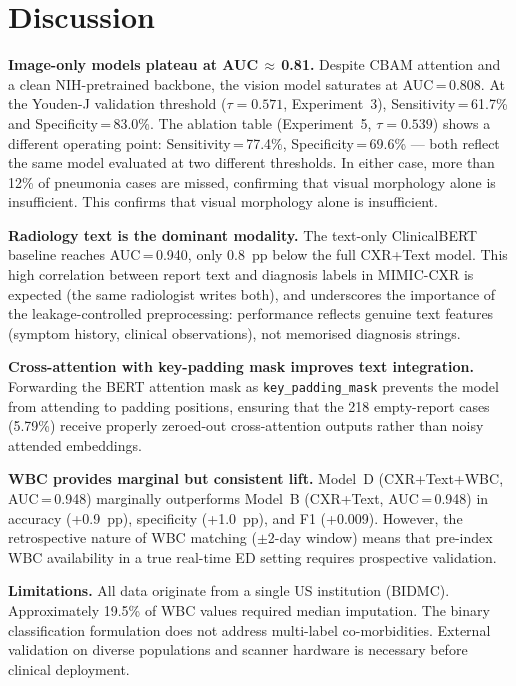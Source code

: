 \documentclass[conference]{IEEEtran}
\begin{document}
\section{\textcolor{aideep}{Discussion}}

\textbf{Image-only models plateau at AUC\,$\approx$\,0.81.} Despite CBAM attention and a clean NIH-pretrained backbone, the vision model saturates at AUC\,=\,0.808. At the Youden-J validation threshold ($\tau\!=\!0.571$, Experiment~3), Sensitivity\,=\,61.7\% and Specificity\,=\,83.0\%. The ablation table (Experiment~5, $\tau\!=\!0.539$) shows a different operating point: Sensitivity\,=\,77.4\%, Specificity\,=\,69.6\% — both reflect the same model evaluated at two different thresholds. In either case, more than 12\% of pneumonia cases are missed, confirming that visual morphology alone is insufficient. This confirms that visual morphology alone is insufficient.

\textbf{Radiology text is the dominant modality.} The text-only ClinicalBERT baseline reaches AUC\,=\,0.940, only 0.8~pp below the full CXR+Text model. This high correlation between report text and diagnosis labels in MIMIC-CXR is expected (the same radiologist writes both), and underscores the importance of the leakage-controlled preprocessing: performance reflects genuine text features (symptom history, clinical observations), not memorised diagnosis strings.

\textbf{Cross-attention with key-padding mask improves text integration.} Forwarding the BERT attention mask as \texttt{key\_padding\_mask} prevents the model from attending to padding positions, ensuring that the 218 empty-report cases (5.79\%) receive properly zeroed-out cross-attention outputs rather than noisy attended embeddings.

\textbf{WBC provides marginal but consistent lift.} Model~D (CXR+Text+WBC, AUC\,=\,0.948) marginally outperforms Model~B (CXR+Text, AUC\,=\,0.948) in accuracy (+0.9~pp), specificity (+1.0~pp), and F1 (+0.009). However, the retrospective nature of WBC matching ($\pm$2-day window) means that pre-index WBC availability in a true real-time ED setting requires prospective validation.

\textbf{Limitations.} All data originate from a single US institution (BIDMC). Approximately 19.5\% of WBC values required median imputation. The binary classification formulation does not address multi-label co-morbidities. External validation on diverse populations and scanner hardware is necessary before clinical deployment.
\end{document}
